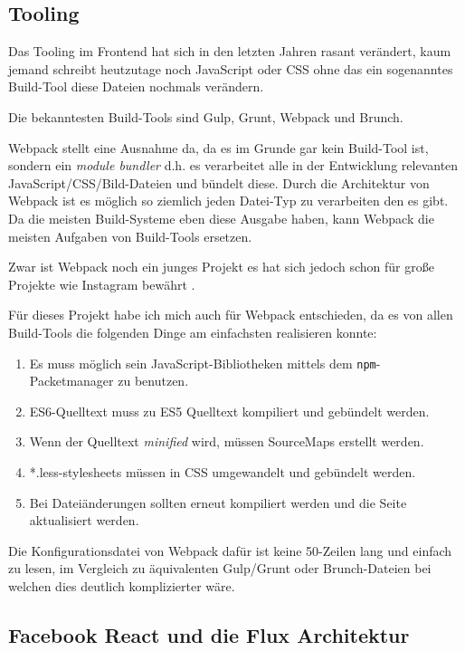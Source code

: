 \documentclass[12pt,twoside]{book}
\begin{document}
\subsection{Tooling}

Das Tooling im Frontend hat sich in den letzten Jahren rasant verändert, kaum jemand schreibt heutzutage noch JavaScript oder CSS ohne das ein sogenanntes Build-Tool diese Dateien nochmals verändern.

Die bekanntesten Build-Tools sind Gulp\cite{gulp}, Grunt\cite{grunt}, Webpack\cite{webpack} und Brunch\cite{brunch}.

Webpack stellt eine Ausnahme da, da es im Grunde gar kein Build-Tool ist, sondern ein \textit{module bundler} d.h. es verarbeitet alle in der Entwicklung relevanten JavaScript/CSS/Bild-Dateien und bündelt diese. Durch die Architektur von Webpack ist es möglich so ziemlich jeden Datei-Typ zu verarbeiten den es gibt.
Da die meisten Build-Systeme eben diese Ausgabe haben, kann Webpack die meisten Aufgaben von Build-Tools ersetzen.

Zwar ist Webpack noch ein junges Projekt es hat sich jedoch schon für große Projekte wie Instagram bewährt \cite{petehuntwebpack}.

Für dieses Projekt habe ich mich auch für Webpack entschieden, da es von allen Build-Tools die folgenden Dinge am einfachsten realisieren konnte:

\begin{enumerate}
	\item Es muss möglich sein JavaScript-Bibliotheken mittels dem \texttt{npm}-Packetmanager zu benutzen.
	\item ES6-Quelltext muss zu ES5 Quelltext kompiliert und gebündelt werden.
	\item Wenn der Quelltext \textit{minified} wird, müssen SourceMaps erstellt werden.
	\item *.less-stylesheets müssen in CSS umgewandelt und gebündelt werden.
	\item Bei Dateiänderungen sollten erneut kompiliert werden und die Seite aktualisiert werden.
\end{enumerate}

Die Konfigurationsdatei von Webpack dafür ist keine 50-Zeilen lang und einfach zu lesen, im Vergleich zu äquivalenten Gulp/Grunt oder Brunch-Dateien bei welchen dies deutlich komplizierter wäre.

\subsection{Facebook React und die Flux Architektur}\label{sec:flux}
\end{document}
